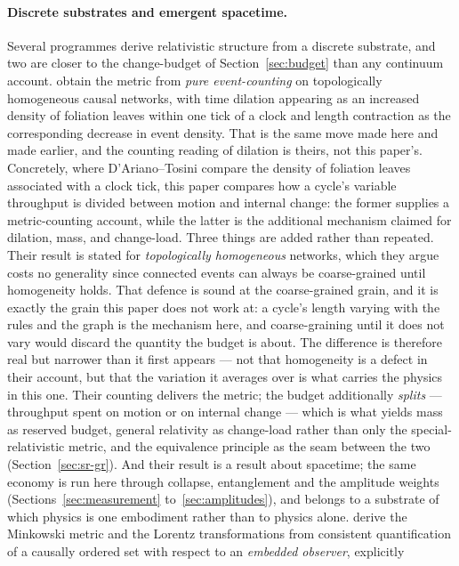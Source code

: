 \documentclass[11pt,a4paper]{article}
\theoremstyle{remark}\newtheorem{remark}[definition]{Remark}
\begin{document}
\paragraph{Discrete substrates and emergent spacetime.} Several programmes derive relativistic
structure from a discrete substrate, and two are closer to the change-budget of
Section~\ref{sec:budget} than any continuum account. \citet{darianotosini2013} obtain the metric
from \emph{pure event-counting} on topologically homogeneous causal networks, with time dilation
appearing as an increased density of foliation leaves within one tick of a clock and length
contraction as the corresponding decrease in event density. That is the same move made here and
made earlier, and the counting reading of dilation is theirs, not this paper's. Concretely, where
D'Ariano--Tosini compare the density of foliation leaves associated with a clock tick, this paper
compares how a cycle's variable throughput is divided between motion and internal change: the former
supplies a metric-counting account, while the latter is the additional mechanism claimed for dilation,
mass, and change-load. Three things are
added rather than repeated. Their result is stated for \emph{topologically homogeneous} networks, which
they argue costs no generality since connected events can always be coarse-grained until
homogeneity holds. That defence is sound at the coarse-grained grain, and it is exactly the grain
this paper does not work at: a cycle's length varying with the rules and the graph is the
mechanism here, and coarse-graining until it does not vary would discard the quantity the budget
is about. The difference is therefore real but narrower than it first appears --- not that
homogeneity is a defect in their account, but that the variation it averages over is what carries
the physics in this one. Their counting delivers the metric;
the budget additionally \emph{splits} --- throughput spent on motion or on internal change --- which
is what yields mass as reserved budget, general relativity as change-load rather than only the
special-relativistic metric, and the equivalence principle as the seam between the two
(Section~\ref{sec:sr-gr}). And their result is a result about spacetime; the same economy is run
here through collapse, entanglement and the amplitude weights (Sections~\ref{sec:measurement}
to~\ref{sec:amplitudes}), and belongs to a substrate of which physics is one embodiment rather
than to physics alone.
\citet{knuth2014} derive the Minkowski metric and the Lorentz transformations from consistent
quantification of a causally ordered set with respect to an \emph{embedded observer}, explicitly
\end{document}
